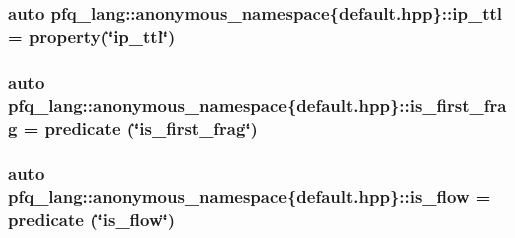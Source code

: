 \hypertarget{namespacepfq__lang_1_1anonymous__namespace_02default_8hpp_03_a3fb042ff6cf76a1f01b4e97e35b30507}{
\subsubsection[{ip\+\_\+ttl}]{\setlength{\rightskip}{0pt plus 5cm}auto pfq\+\_\+lang\+::anonymous\+\_\+namespace\{default.\+hpp\}\+::ip\+\_\+ttl = {\bf property}(\char`\"{}ip\+\_\+ttl\char`\"{})}}\label{namespacepfq__lang_1_1anonymous__namespace_02default_8hpp_03_a3fb042ff6cf76a1f01b4e97e35b30507}
\hypertarget{namespacepfq__lang_1_1anonymous__namespace_02default_8hpp_03_a235bc51b1c287765f0a4bd391ed089a9}{
\subsubsection[{is\+\_\+first\+\_\+frag}]{\setlength{\rightskip}{0pt plus 5cm}auto pfq\+\_\+lang\+::anonymous\+\_\+namespace\{default.\+hpp\}\+::is\+\_\+first\+\_\+frag = {\bf predicate} (\char`\"{}is\+\_\+first\+\_\+frag\char`\"{})}}\label{namespacepfq__lang_1_1anonymous__namespace_02default_8hpp_03_a235bc51b1c287765f0a4bd391ed089a9}
\hypertarget{namespacepfq__lang_1_1anonymous__namespace_02default_8hpp_03_a32aab6804e2daac2458f7c050ed69cf1}{
\subsubsection[{is\+\_\+flow}]{\setlength{\rightskip}{0pt plus 5cm}auto pfq\+\_\+lang\+::anonymous\+\_\+namespace\{default.\+hpp\}\+::is\+\_\+flow = {\bf predicate} (\char`\"{}is\+\_\+flow\char`\"{})}}\label{namespacepfq__lang_1_1anonymous__namespace_02default_8hpp_03_a32aab6804e2daac2458f7c050ed69cf1}
